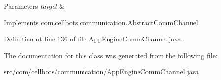 \begin{DoxyParams}{Parameters}
{\em target} & \\
\hline
\end{DoxyParams}


Implements \hyperlink{classcom_1_1cellbots_1_1communication_1_1_abstract_comm_channel_a8a067cf00a2435c21ea5989af0d94905}{com.\-cellbots.\-communication.\-Abstract\-Comm\-Channel}.



Definition at line 136 of file App\-Engine\-Comm\-Channel.\-java.



The documentation for this class was generated from the following file\-:\begin{DoxyCompactItemize}
\item 
src/com/cellbots/communication/\hyperlink{_app_engine_comm_channel_8java}{App\-Engine\-Comm\-Channel.\-java}\end{DoxyCompactItemize}
